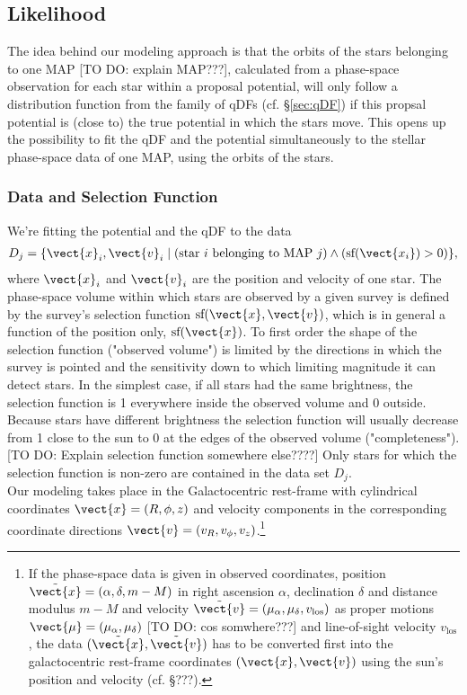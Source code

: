 \subsection{Likelihood}

The idea behind our modeling approach is that the orbits of the stars belonging to one MAP [TO DO: explain MAP???], calculated from a phase-space observation for each star within a proposal potential,  will only follow a distribution function from the family of qDFs (cf. \S\ref{sec:qDF}) if this propsal potential is (close to) the true potential in which the stars move. This opens up the possibility to fit the qDF and the potential simultaneously to the stellar phase-space data of one MAP, using the orbits of the stars. 

\subsubsection{Data and Selection Function} 

We're fitting the potential and the qDF to the data
\begin{eqnarray*}
D_j  =\{ \vect{x}_i,\vect{v}_i \mid \text{(star $i$ belonging to MAP $j$)} \wedge (\text{sf}(\vect{x_i}) > 0) \},
\end{eqnarray*}
where  $\vect{x}_i$ and $\vect{v}_i$ are the position and velocity of one star. The phase-space volume within which stars are observed by a given survey is defined by the survey's selection function $\text{sf}(\vect{x},\vect{v})$, which is in general a function of the position only, $\text{sf}(\vect{x})$. To first order the shape of the selection function ("observed volume") is limited by the directions in which the survey is pointed and the sensitivity down to which limiting magnitude it can detect stars. In the simplest case, if all stars had the same brightness, the selection function is 1 everywhere inside the observed volume and 0 outside. Because stars have different brightness the selection function will usually decrease from 1 close to the sun to 0 at the edges of the observed volume ("completeness"). [TO DO: Explain selection function somewhere else????] Only stars for which the selection function is non-zero are contained in the data set $D_j$.
\\Our modeling takes place in the Galactocentric rest-frame with cylindrical coordinates $\vect{x} = (R,\phi,z)$ and velocity components in the corresponding coordinate directions $\vect{v} = (v_R,v_\phi,v_z)$.\footnote{If the phase-space data is given in observed coordinates, position $\tilde{\vect{x}}=(\alpha,\delta,m-M)$ in right ascension $\alpha$, declination $\delta$ and distance modulus $m-M$ and velocity $\tilde{\vect{v}} = (\mu_\alpha,\mu_\delta,v_\text{los})$ as proper motions $\vect{\mu}=(\mu_\alpha,\mu_\delta)$ [TO DO: cos somwhere???] and line-of-sight velocity $v_\text{los}$, the data $(\tilde{\vect{x}},\tilde{\vect{v}})$ has to be converted first into the galactocentric rest-frame coordinates $(\vect{x},\vect{v})$ using the sun's position and velocity (cf. \S ???).}

